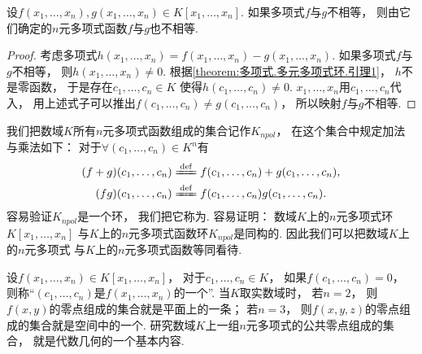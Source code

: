 \begin{theorem}
设\(f(x_1,\dotsc,x_n),g(x_1,\dotsc,x_n) \in K[x_1,\dotsc,x_n]\).
如果多项式\(f\)与\(g\)不相等，
则由它们确定的\(n\)元多项式函数\(f\)与\(g\)也不相等.
\begin{proof}
考虑多项式\(
	h(x_1,\dotsc,x_n)
	=f(x_1,\dotsc,x_n)
	-g(x_1,\dotsc,x_n)
\).
如果多项式\(f\)与\(g\)不相等，
则\(h(x_1,\dotsc,x_n)\neq0\).
根据\cref{theorem:多项式.多元多项式环.引理1}，
\(h\)不是零函数，
于是存在\(c_1,\dotsc,c_n \in K\)
使得\(h(c_1,\dotsc,c_n)\neq0\).
\(x_1,\dotsc,x_n\)用\(c_1,\dotsc,c_n\)代入，
用上述式子可以推出\(f(c_1,\dotsc,c_n) \neq g(c_1,\dotsc,c_n)\)，
所以映射\(f\)与\(g\)不相等.
\end{proof}
\end{theorem}

我们把数域\(K\)所有\(n\)元多项式函数组成的集合记作\(K_{npol}\)，
在这个集合中规定加法与乘法如下：
对于\(\forall(c_1,\dotsc,c_n) \in K^n\)有\begin{gather*}
	(f+g)(c_1,\dotsc,c_n)
	\defeq
	f(c_1,\dotsc,c_n)+g(c_1,\dotsc,c_n), \\
	(fg)(c_1,\dotsc,c_n)
	\defeq
	f(c_1,\dotsc,c_n) g(c_1,\dotsc,c_n).
\end{gather*}
容易验证\(K_{npol}\)是一个环，
我们把它称为.
容易证明：
数域\(K\)上的\(n\)元多项式环\(K[x_1,\dotsc,x_n]\)
与\(K\)上的\(n\)元多项式函数环\(K_{npol}\)是同构的.
因此我们可以把数域\(K\)上的\(n\)元多项式
与\(K\)上的\(n\)元多项式函数等同看待.

设\(f(x_1,\dotsc,x_n) \in K[x_1,\dotsc,x_n]\)，
对于\(c_1,\dotsc,c_n \in K\)，
如果\(f(c_1,\dotsc,c_n)=0\)，
则称“\((c_1,\dotsc,c_n)\)是\(f(x_1,\dotsc,x_n)\)的一个”.
当\(K\)取实数域时，
若\(n=2\)，
则\(f(x,y)\)的零点组成的集合就是平面上的一条；
若\(n=3\)，
则\(f(x,y,z)\)的零点组成的集合就是空间中的一个.
研究数域\(K\)上一组\(n\)元多项式的公共零点组成的集合，
就是代数几何的一个基本内容.

